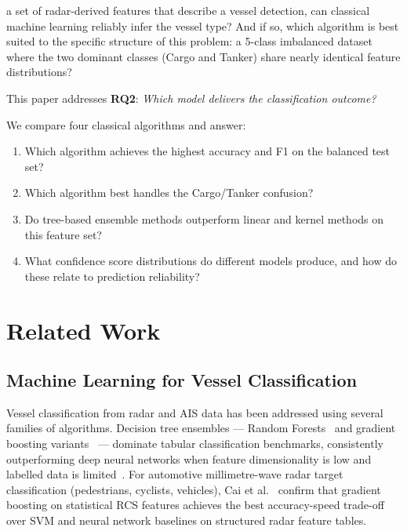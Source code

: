 \documentclass[journal]{IEEEtran}
\begin{document}
 a set of radar-derived features that describe a vessel
detection, can classical machine learning reliably infer the vessel type?
And if so, which algorithm is best suited to the specific structure of this
problem: a 5-class imbalanced dataset where the two dominant classes
(Cargo and Tanker) share nearly identical feature distributions?

This paper addresses \textbf{RQ2}: \textit{Which model delivers the classification outcome?}

We compare four classical algorithms and answer:
\begin{enumerate}
  \item Which algorithm achieves the highest accuracy and F1 on the balanced test set?
  \item Which algorithm best handles the Cargo/Tanker confusion?
  \item Do tree-based ensemble methods outperform linear and kernel methods on
        this feature set?
  \item What confidence score distributions do different models produce, and
        how do these relate to prediction reliability?
\end{enumerate}

\section{Related Work}
\label{sec:relatedwork}

\subsection{Machine Learning for Vessel Classification}

Vessel classification from radar and AIS data has been addressed using several families of algorithms. Decision tree ensembles --- Random Forests~\cite{breiman2001random} and gradient boosting variants~\cite{friedman2001greedy,chen2016xgboost} --- dominate tabular classification benchmarks, consistently outperforming deep neural networks when feature dimensionality is low and labelled data is limited~\cite{grinsztajn2022trees}. For automotive millimetre-wave radar target classification (pedestrians, cyclists, vehicles), Cai et al.~\cite{cai2021mmwave} confirm that gradient boosting on statistical RCS features achieves the best accuracy-speed trade-off over SVM and neural network baselines on structured radar feature tables.
\end{document}
